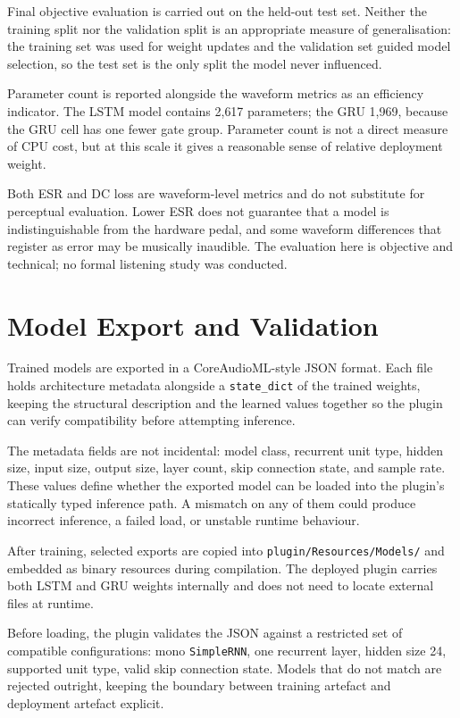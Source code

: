 Final objective evaluation is carried out on the held-out test set. Neither the training split nor the validation split is an appropriate measure of generalisation: the training set was used for weight updates and the validation set guided model selection, so the test set is the only split the model never influenced.

Parameter count is reported alongside the waveform metrics as an efficiency indicator. The LSTM model contains 2,617 parameters; the GRU 1,969, because the GRU cell has one fewer gate group. Parameter count is not a direct measure of CPU cost, but at this scale it gives a reasonable sense of relative deployment weight.

Both ESR and DC loss are waveform-level metrics and do not substitute for perceptual evaluation. Lower ESR does not guarantee that a model is indistinguishable from the hardware pedal, and some waveform differences that register as error may be musically inaudible. The evaluation here is objective and technical; no formal listening study was conducted.

\section{Model Export and Validation}
\label{sec:model-export-validation}

Trained models are exported in a CoreAudioML-style JSON format. Each file holds architecture metadata alongside a \texttt{state\_dict} of the trained weights, keeping the structural description and the learned values together so the plugin can verify compatibility before attempting inference.

The metadata fields are not incidental: model class, recurrent unit type, hidden size, input size, output size, layer count, skip connection state, and sample rate. These values define whether the exported model can be loaded into the plugin's statically typed inference path. A mismatch on any of them could produce incorrect inference, a failed load, or unstable runtime behaviour.

After training, selected exports are copied into \texttt{plugin/Resources/Models/} and embedded as binary resources during compilation. The deployed plugin carries both LSTM and GRU weights internally and does not need to locate external files at runtime.

Before loading, the plugin validates the JSON against a restricted set of compatible configurations: mono \texttt{SimpleRNN}, one recurrent layer, hidden size 24, supported unit type, valid skip connection state. Models that do not match are rejected outright, keeping the boundary between training artefact and deployment artefact explicit.

